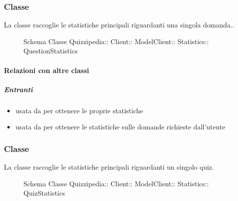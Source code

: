 \subsubsection{Classe }
La classe raccoglie le statistiche principali riguardanti una singola domanda..
\begin{figure}[H]
\centering
\noindent{}
\caption[Schema Classe QuestionStatistics]{Schema Classe Quizzipedia:: Client:: ModelClient:: Statistics:: QuestionStatistics}
\end{figure}
\paragraph{Relazioni con altre classi}
\subparagraph{Entranti}
\begin{itemize}
\item usata da  per ottenere le proprie statistiche
\item usata da  per ottenere le statistiche sulle domande richieste dall'utente
\end{itemize}
\subsubsection{Classe }
La classe raccoglie le statistiche principali riguardanti un singolo quiz.
\begin{figure}[H]
\centering
\noindent{}
\caption[Schema Classe QuizStatistics]{Schema Classe Quizzipedia:: Client:: ModelClient:: Statistics:: QuizStatistics}
\end{figure}
